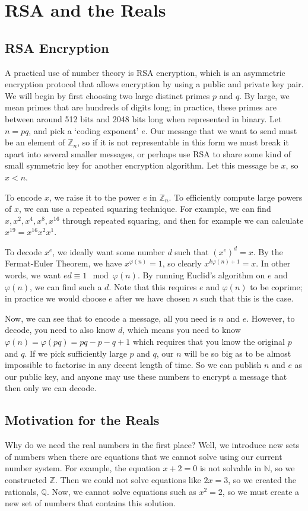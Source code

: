 \documentclass{article}
\begin{document}
	\section{RSA and the Reals}
	\subsection{RSA Encryption}
	A practical use of number theory is RSA encryption, which is an asymmetric encryption protocol that allows encryption by using a public and private key pair. We will begin by first choosing two large distinct primes $p$ and $q$. By large, we mean primes that are hundreds of digits long; in practice, these primes are between around 512 bits and 2048 bits long when represented in binary. Let $n=pq$, and pick a `coding exponent' $e$. Our message that we want to send must be an element of $\mathbb Z_n$, so if it is not representable in this form we must break it apart into several smaller messages, or perhaps use RSA to share some kind of small symmetric key for another encryption algorithm. Let this message be $x$, so $x < n$.

	To encode $x$, we raise it to the power $e$ in $\mathbb Z_n$. To efficiently compute large powers of $x$, we can use a repeated squaring technique. For example, we can find $x, x^2, x^4, x^8, x^{16}$ through repeated squaring, and then for example we can calculate $x^{19} = x^{16} x^{2} x^{1}$.

	To decode $x^e$, we ideally want some number $d$ such that $(x^e)^d = x$. By the Fermat-Euler Theorem, we have $x^{\varphi(n)} = 1$, so clearly $x^{k\varphi(n) + 1} = x$. In other words, we want $ed \equiv 1 \mod \varphi(n)$. By running Euclid's algorithm on $e$ and $\varphi(n)$, we can find such a $d$. Note that this requires $e$ and $\varphi(n)$ to be coprime; in practice we would choose $e$ after we have chosen $n$ such that this is the case.

	Now, we can see that to encode a message, all you need is $n$ and $e$. However, to decode, you need to also know $d$, which means you need to know $\varphi(n) = \varphi(pq) = pq - p - q + 1$ which requires that you know the original $p$ and $q$. If we pick sufficiently large $p$ and $q$, our $n$ will be so big as to be almost impossible to factorise in any decent length of time. So we can publish $n$ and $e$ as our public key, and anyone may use these numbers to encrypt a message that then only we can decode.

	\subsection{Motivation for the Reals}
	Why do we need the real numbers in the first place? Well, we introduce new sets of numbers when there are equations that we cannot solve using our current number system. For example, the equation $x+2=0$ is not solvable in $\mathbb N$, so we constructed $\mathbb Z$. Then we could not solve equations like $2x = 3$, so we created the rationals, $\mathbb Q$. Now, we cannot solve equations such as $x^2 = 2$, so we must create a new set of numbers that contains this solution.
\end{document}

